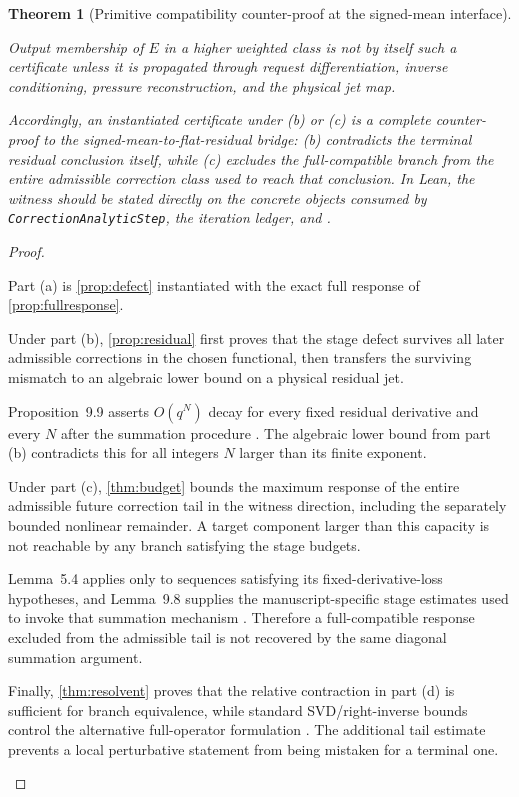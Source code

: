 \documentclass[12pt]{article}
\theoremstyle{plain}
\newtheorem{theorem}{Theorem}[section]
\theoremstyle{definition}
\theoremstyle{remark}
\begin{document}
\begin{theorem}[Primitive compatibility counter-proof at the signed-mean interface]
\begin{enumerate}[label=(\alph*),leftmargin=2.2em,itemsep=0.35em]
Output membership of \(E\) in a higher weighted class is not by itself such a certificate unless it is propagated through request differentiation, inverse conditioning, pressure reconstruction, and the physical jet map.
\end{enumerate}

Accordingly, an instantiated certificate under (b) or (c) is a complete counter-proof to the signed-mean-to-flat-residual bridge: (b) contradicts the terminal residual conclusion itself, while (c) excludes the full-compatible branch from the entire admissible correction class used to reach that conclusion. In Lean, the witness should be stated directly on the concrete objects consumed by \texttt{CorrectionAnalyticStep}, the iteration ledger, and .
\end{theorem}

\begin{proof}
\begin{prooflines}
\item Part (a) is \cref{prop:defect} instantiated with the exact full response of \cref{prop:fullresponse}.
\item Under part (b), \cref{prop:residual} first proves that the stage defect survives all later admissible corrections in the chosen functional, then transfers the surviving mismatch to an algebraic lower bound on a physical residual jet.
\item Proposition~9.9 asserts \(O(q^N)\) decay for every fixed residual derivative and every \(N\) after the summation procedure \cite[Prop.~9.9]{OpenAI2026}. The algebraic lower bound from part (b) contradicts this for all integers \(N\) larger than its finite exponent.
\item Under part (c), \cref{thm:budget} bounds the maximum response of the entire admissible future correction tail in the witness direction, including the separately bounded nonlinear remainder. A target component larger than this capacity is not reachable by any branch satisfying the stage budgets.
\item Lemma~5.4 applies only to sequences satisfying its fixed-derivative-loss hypotheses, and Lemma~9.8 supplies the manuscript-specific stage estimates used to invoke that summation mechanism \cite[Lemmas~5.4 and 9.8]{OpenAI2026}. Therefore a full-compatible response excluded from the admissible tail is not recovered by the same diagonal summation argument.
\item Finally, \cref{thm:resolvent} proves that the relative contraction in part (d) is sufficient for branch equivalence, while standard SVD/right-inverse bounds control the alternative full-operator formulation \cite{StewartSun1990,Wedin1972,GolubVanLoan2013}. The additional tail estimate prevents a local perturbative statement from being mistaken for a terminal one.
\end{prooflines}
\end{proof}
\end{document}
